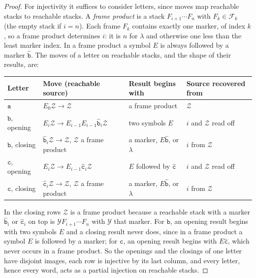 \documentclass[11pt]{article}
\numberwithin{equation}{section}
\theoremstyle{plain}
\theoremstyle{definition}
\theoremstyle{remark}
\theoremstyle{plain}
\newcommand{\eps}{\lambda}
\begin{document}
\begin{proof}
For injectivity it suffices to consider letters, since moves map reachable
stacks to reachable stacks.  A \emph{frame product} is a stack
$F_{i+1}\cdots F_n$ with $F_k\in\mathcal F_k$ (the empty stack if $i=n$).  Each
frame $F_k$ contains exactly one marker, of index $k$, so a frame product
determines $i$: it is $n$ for $\eps$ and otherwise one less than the least
marker index.  In a frame product a symbol $E$ is always followed by a marker
$\hat{\mathtt b}$.  The moves of a letter on reachable stacks, and the shape of
their results, are:
\begin{center}
\footnotesize
\renewcommand{\arraystretch}{1.15}
\begin{tabular}{@{}llll@{}}
\hline
Letter & Move (reachable source) & Result begins with & Source recovered from\\
\hline
$\mathtt a$ & $E_0\mathcal Z\to\mathcal Z$ & a frame product & $\mathcal Z$\\
$\mathtt b$, opening & $E_i\mathcal Z\to E_{i-1}E_{i-1}\hat{\mathtt b}_i\mathcal Z$ & two symbols $E$ & $i$ and $\mathcal Z$ read off\\
$\mathtt b$, closing & $\hat{\mathtt b}_i\mathcal Z\to\mathcal Z$, $\mathcal Z$ a frame product & a marker, $E\hat{\mathtt b}$, or $\eps$ & $i$ from $\mathcal Z$\\
$\mathtt c$, opening & $E_i\mathcal Z\to E_{i-1}\hat{\mathtt c}_i\mathcal Z$ & $E$ followed by $\hat{\mathtt c}$ & $i$ and $\mathcal Z$ read off\\
$\mathtt c$, closing & $\hat{\mathtt c}_i\mathcal Z\to\mathcal Z$, $\mathcal Z$ a frame product & a marker, $E\hat{\mathtt b}$, or $\eps$ & $i$ from $\mathcal Z$\\
\hline
\end{tabular}
\end{center}
In the closing rows $\mathcal Z$ is a frame product because a reachable stack
with a marker $\hat{\mathtt b}_i$ or $\hat{\mathtt c}_i$ on top is $\mathcal YF_{i+1}\cdots
F_n$ with $\mathcal Y$ that marker.  For $\mathtt b$, an opening result begins with
two symbols $E$ and a closing result never does, since in a frame product a
symbol $E$ is followed by a marker; for $\mathtt c$, an opening result begins with
$E\hat{\mathtt c}$, which never occurs in a frame product.  So the openings and the
closings of one letter have disjoint images, each row is injective by its last
column, and every letter, hence every word, acts as a partial injection on
reachable stacks.
\end{proof}
\end{document}
